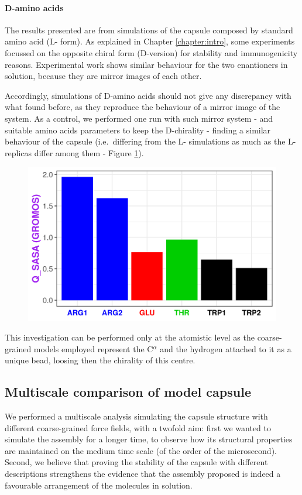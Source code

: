 \paragraph{D-amino acids} The results presented are from simulations of the capsule composed by standard amino acid (L- form). As explained in Chapter \ref{chapter:intro}, some experiments focussed on the opposite chiral form (D-version) for stability and immunogenicity reasons. Experimental work shows similar behaviour for the two enantioners in solution, because they are mirror images of each other.

Accordingly, simulations of D-amino acids should not give any discrepancy with what found before, as they reproduce the behaviour of a mirror image of the system. As a control, we performed one run with such mirror system - and suitable amino acids parameters to keep the D-chirality - finding a similar behaviour of the capsule (i.e.\ differing from the L- simulations as much as the L- replicas differ among them - Figure \ref{fig:D_aa}).

\begin{figure}[t]
\centering
\includegraphics[height=0.3\linewidth]{3results_capsule/pics/st_Qsasa.png}
\caption[cccc]{}
\label{fig:D_aa}
\end{figure}

This investigation can be performed only at the atomistic level as the coarse-grained models employed represent the C$^\alpha$ and the hydrogen attached to it as a unique bead, loosing then the chirality of this centre.


\subsection{Multiscale comparison of model capsule} \label{sec:res_multiscale}

We performed a multiscale analysis simulating the capsule structure with different coarse-grained force fields, with a twofold aim: first we wanted to simulate the assembly for a longer time, to observe how its structural properties are maintained on the medium time scale (of the order of the microsecond). Second, we believe that proving the stability of the capsule with different descriptions strengthens the evidence that the assembly proposed is indeed a favourable arrangement of the molecules in solution.

